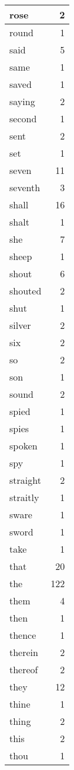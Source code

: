 \begin{center}
\begin{longtable}{l|r}
rose & 2 \\ \hline
round & 1 \\ \hline
said & 5 \\ \hline
same & 1 \\ \hline
saved & 1 \\ \hline
saying & 2 \\ \hline
second & 1 \\ \hline
sent & 2 \\ \hline
set & 1 \\ \hline
seven & 11 \\ \hline
seventh & 3 \\ \hline
shall & 16 \\ \hline
shalt & 1 \\ \hline
she & 7 \\ \hline
sheep & 1 \\ \hline
shout & 6 \\ \hline
shouted & 2 \\ \hline
shut & 1 \\ \hline
silver & 2 \\ \hline
six & 2 \\ \hline
so & 2 \\ \hline
son & 1 \\ \hline
sound & 2 \\ \hline
spied & 1 \\ \hline
spies & 1 \\ \hline
spoken & 1 \\ \hline
spy & 1 \\ \hline
straight & 2 \\ \hline
straitly & 1 \\ \hline
sware & 1 \\ \hline
sword & 1 \\ \hline
take & 1 \\ \hline
that & 20 \\ \hline
the & 122 \\ \hline
them & 4 \\ \hline
then & 1 \\ \hline
thence & 1 \\ \hline
therein & 2 \\ \hline
thereof & 2 \\ \hline
they & 12 \\ \hline
thine & 1 \\ \hline
thing & 2 \\ \hline
this & 2 \\ \hline
thou & 1 \\ \hline

\end{longtable}
\end{center}
